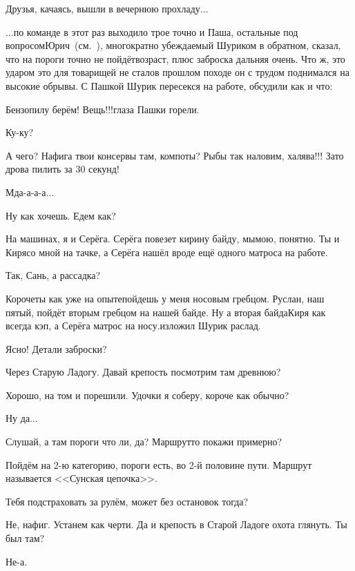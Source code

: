 Друзья, качаясь, вышли в вечернюю прохладу$\ldots$

\vspace{0.5cm}

$\ldots$по команде в этот раз выходило трое точно и Паша, остальные под вопросом\mdash Юрич~(см.~\cite{СоболевВепсскаяЛетопись}), многократно убеждаемый Шуриком в обратном, сказал, что на пороги точно не пойдёт\mdash возраст, плюс заброска дальняя очень. Что ж, это ударом это для товарищей не стало\mdash в прошлом походе он с трудом поднимался на высокие обрывы. С Пашкой Шурик пересекся на работе, обсудили как и что:

\diagdash Бензопилу берём! Вещь!!!\mdash глаза Пашки горели.

\diagdash Ку-ку?

\diagdash А чего? Нафига твои консервы там, компоты? Рыбы так наловим, халява!!! Зато дрова пилить за 30 секунд!

\diagdash Мда-а-а-а$\ldots$

\diagdash Ну как хочешь. Едем как?

\diagdash На машинах, я и Серёга. Серёга повезет кирину байду, мы\mdash мою, понятно. Ты и Киря\mdash со мной на тачке, а Серёга нашёл вроде ещё одного матроса на работе.

\diagdash Так, Сань, а рассадка?

\diagdash Короче\mdash ты как уже на опыте\mdash пойдешь у меня носовым гребцом. Руслан, наш пятый, пойдёт вторым гребцом на нашей байде. Ну а вторая байда\mdash Киря как всегда кэп, а Серёга матрос на носу.\mdash изложил Шурик раслад.

\diagdash Ясно! Детали заброски?

\diagdash Через Старую Ладогу. Давай крепость посмотрим там древнюю?

\diagdash Хорошо, на том и порешили. Удочки я соберу, короче как обычно?

\diagdash Ну да$\ldots$

\diagdash Слушай, а там пороги что ли, да? Маршрут\sdash то покажи примерно?

\diagdash Пойдём на 2-ю категорию, пороги есть, во 2-й половине пути. Маршрут называется <<Сунская цепочка>>.

\diagdash Тебя подстраховать за рулём, может без остановок тогда?

\diagdash Не, нафиг. Устанем как черти. Да и крепость в Старой Ладоге охота глянуть. Ты был там?

\diagdash Не-а.

